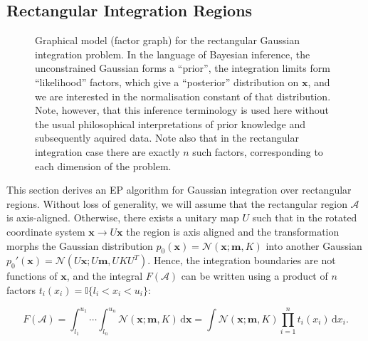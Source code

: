 \documentclass[twoside,11pt]{article}
\newcommand{\II}{\mathbb{I}}
\def\x{{\mathbf x}}
\def\m{{\mathbf m}}
\def\regionA{\mathcal{A}}
\newcommand{\N}{\mathcal{N}}
\renewcommand{\d}{\,\mathrm{d}}
\begin{document}
\subsection{Rectangular Integration Regions}
\label{sec:rect-integr-regi}

\begin{figure}[ht]
  \centering
  \caption{Graphical model (factor graph) for the rectangular Gaussian integration
    problem. In the language of Bayesian inference, the unconstrained
    Gaussian forms a ``prior'', the integration limits form
    ``likelihood'' factors, which give a ``posterior'' distribution on
    $\x$, and we are interested in the normalisation constant of that
    distribution. Note, however, that this inference terminology is
    used here without the usual philosophical interpretations of prior
    knowledge and subsequently aquired data.  Note also that in the rectangular integration case there are exactly $n$ such factors, corresponding to each dimension of the problem.}
  \label{fig:fac_rect}
\end{figure}

This section derives an EP algorithm for Gaussian integration over rectangular regions. Without loss of generality, we will assume that the rectangular region $\regionA$ is axis-aligned. Otherwise, there exists a unitary map $ U$ such that in the rotated coordinate system $\x\to U\x$ the region is axis aligned and the transformation morphs the Gaussian distribution $p_0(\x)=\N(\x; \m,K)$ into another Gaussian $p_0'(\x) = \N(U\x; U\m,UKU^T)$. Hence, the integration boundaries are not functions of $\x$, and the integral $F(\regionA)$ can be written using a product of $n$ factors $t_i(x_i) = \II\{l_i<x_i<u_i\}$: 

\begin{equation}
  \label{eq:7}
  F(\regionA) = \int_{l_1} ^{u_1} \cdots \int_{l_n} ^{u_n} \N(\x;\m,K) \d\x = \int \N(\x;\m,K) \prod_{i=1} ^n t_i(x_i) \d x_i.
\end{equation}
\end{document}
